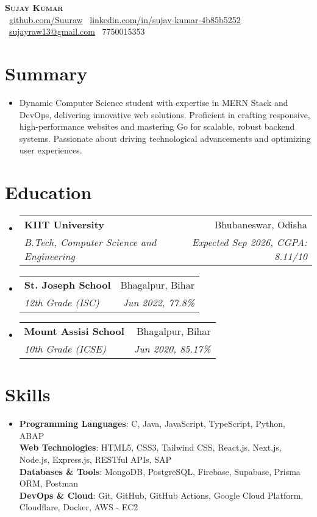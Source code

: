 \documentclass[letterpaper,11pt]{article}
\makeatletter
\newcommand{\resumeSubheading}[4]{
  \vspace{-4pt}\item
  \begin{tabular*}{0.98\textwidth}[t]{l@{\extracolsep{\fill}}r}
    \textbf{#1} & #2 \\
    \textit{\small#3} & \textit{\small #4} \\
  \end{tabular*}\vspace{-8pt}
}
\newcommand{\resumeSubHeadingListStart}{\begin{itemize}[leftmargin=0.1in, label={}]}
\newcommand{\resumeSubHeadingListEnd}{\end{itemize}\vspace{-8pt}}
\makeatother
\begin{document}
\begin{center}
  \textbf{\Huge \scshape Sujay Kumar} \\ \vspace{12pt}
  \small
  \vspace{10pt}
  \faGithub\ \href{https://github.com/Suuraw}{github.com/Suuraw} \quad
  \faLinkedin\ \href{https://linkedin.com/in/sujay-kumar-4b85b5252}{linkedin.com/in/sujay-kumar-4b85b5252} \quad
  \faEnvelope\ \href{mailto:sujayraw13@gmail.com}{sujayraw13@gmail.com} \quad
  \faPhone\ 7750015353
\end{center}
\vspace{-10pt}

\section{Summary}
\vspace{6pt}
\resumeSubHeadingListStart
  \item{Dynamic Computer Science student with expertise in MERN Stack and DevOps, delivering innovative web solutions. Proficient in crafting responsive, high-performance websites and mastering Go for scalable, robust backend systems. Passionate about driving technological advancements and optimizing user experiences.}
\resumeSubHeadingListEnd

\section{Education}
\vspace{6pt}
\resumeSubHeadingListStart
  \resumeSubheading{KIIT University}{Bhubaneswar, Odisha}{B.Tech, Computer Science and Engineering}{Expected Sep 2026, CGPA: 8.11/10}
  \resumeSubheading{St. Joseph School}{Bhagalpur, Bihar}{12th Grade (ISC)}{Jun 2022, 77.8\%}
  \resumeSubheading{Mount Assisi School}{Bhagalpur, Bihar}{10th Grade (ICSE)}{Jun 2020, 85.17\%}
\resumeSubHeadingListEnd

\section{Skills}
\vspace{6pt}
\resumeSubHeadingListStart
  \item{
    \textbf{Programming Languages}: C, Java, JavaScript, TypeScript, Python, ABAP \\ \vspace{2pt}
    \textbf{Web Technologies}: HTML5, CSS3, Tailwind CSS, React.js, Next.js, Node.js, Express.js, RESTful APIs, SAP \\ \vspace{2pt}
    \textbf{Databases \& Tools}: MongoDB, PostgreSQL, Firebase, Supabase, Prisma ORM, Postman \\  \vspace{2pt}
    \textbf{DevOps \& Cloud}: Git, GitHub, GitHub Actions, Google Cloud Platform, Cloudflare, Docker, AWS - EC2
  }
\resumeSubHeadingListEnd
\end{document}
